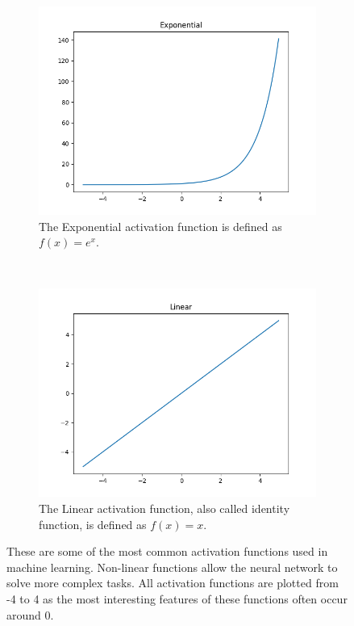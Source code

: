 \begin{figure}[h!]
\begin{subfigure}[t]{0.5\textwidth}
		\centering
		\includegraphics[width=\textwidth]{img/methodology_neuralNetwork_activationFunction_exponential.png}
		\caption{The Exponential activation function is defined as $f(x) = e^x$.}
	\end{subfigure}%
	~ 
	\begin{subfigure}[t]{0.5\textwidth}
		\centering
		\includegraphics[width=\textwidth]{img/methodology_neuralNetwork_activationFunction_linear.png}
		\caption{The Linear activation function, also called identity function, is defined as $f(x) = x$.}
	\end{subfigure}
	\caption{These are some of the most common activation functions used in machine learning. Non-linear functions allow the neural network to solve more complex tasks. All activation functions are plotted from -4 to 4 as the most interesting features of these functions often occur around 0.}
	\label{pic:methodology_neuralNetwork_activationFunction}
\end{figure}

